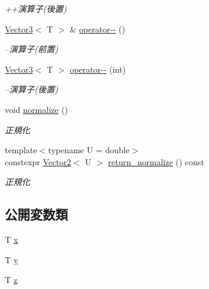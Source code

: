 \begin{DoxyCompactItemize}
\begin{DoxyCompactList}\small\item\em ++演算子(後置) \end{DoxyCompactList}\item 
\mbox{\hyperlink{classsaki_1_1_vector3}{Vector3}}$<$ T $>$ \& \mbox{\hyperlink{classsaki_1_1_vector3_a0811320313e336ec3182422ca4c726f6}{operator-\/-\/}} ()
\begin{DoxyCompactList}\small\item\em --演算子(前置) \end{DoxyCompactList}\item 
\mbox{\hyperlink{classsaki_1_1_vector3}{Vector3}}$<$ T $>$ \mbox{\hyperlink{classsaki_1_1_vector3_a4d1ff848a3a4bcce6c7911e2f7ac3d7d}{operator-\/-\/}} (int)
\begin{DoxyCompactList}\small\item\em --演算子(後置) \end{DoxyCompactList}\item 
void \mbox{\hyperlink{classsaki_1_1_vector3_a7b9496274bab6ea6147e6a09e1493110}{normalize}} ()
\begin{DoxyCompactList}\small\item\em 正規化 \end{DoxyCompactList}\item 
{\footnotesize template$<$typename U  = double$>$ }\\constexpr \mbox{\hyperlink{classsaki_1_1_vector2}{Vector2}}$<$ U $>$ \mbox{\hyperlink{classsaki_1_1_vector3_ab4bbc1a8a3cbf860996a5136b3c1536f}{return\+\_\+normalize}} () const
\begin{DoxyCompactList}\small\item\em 正規化 \end{DoxyCompactList}\end{DoxyCompactItemize}
\subsection*{公開変数類}
\begin{DoxyCompactItemize}
\item 
T \mbox{\hyperlink{classsaki_1_1_vector3_a1fa58e9e75dbeb650afb3db740f3131c}{x}}
\item 
T \mbox{\hyperlink{classsaki_1_1_vector3_aba41be4543769bd023387691acf654dd}{y}}
\item 
T \mbox{\hyperlink{classsaki_1_1_vector3_abb4ddf92f66d05e965fbd17ab3e655ff}{z}}
\end{DoxyCompactItemize}


